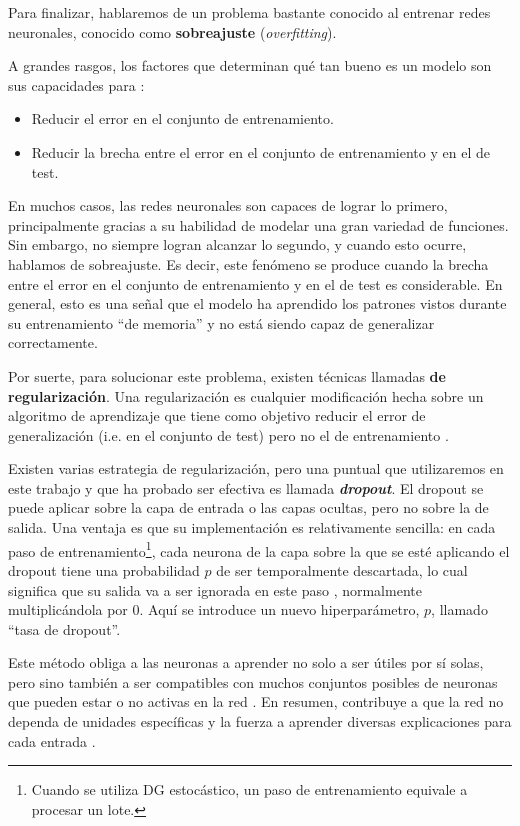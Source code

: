 \documentclass[../../main.tex]{subfiles}
\begin{document}
\bigskip
Para finalizar, hablaremos de un problema bastante conocido al entrenar redes neuronales,
conocido como \textbf{sobreajuste} (\textit{overfitting}).

A grandes rasgos, los factores que determinan qué tan bueno es un modelo son sus capacidades
para \cite{deep-learning}:
\begin{itemize}[itemsep=0.1cm]
    \item Reducir el error en el conjunto de entrenamiento.
    \item Reducir la brecha entre el error en el conjunto de entrenamiento y en el de
    test.
\end{itemize}

En muchos casos, las redes neuronales son capaces de lograr lo primero, principalmente
gracias a su habilidad de modelar una gran variedad de funciones. Sin embargo, no siempre
logran alcanzar lo segundo, y cuando esto ocurre, hablamos de sobreajuste. Es decir, este
fenómeno se produce cuando la brecha entre el error en el conjunto de entrenamiento y en
el de test es considerable. En general, esto es una señal que el modelo ha aprendido los
patrones vistos durante su entrenamiento ``de memoria'' y no está siendo capaz de
generalizar correctamente.

Por suerte, para solucionar este problema, existen técnicas llamadas \textbf{de
regularización}. Una regularización es cualquier modificación hecha sobre un algoritmo de
aprendizaje que tiene como objetivo reducir el error de generalización (i.e. en el
conjunto de test) pero no el de entrenamiento \cite{deep-learning}.

Existen varias estrategia de regularización, pero una puntual que utilizaremos en este
trabajo y que ha probado ser efectiva es llamada \textbf{\textit{dropout}}. El dropout se
puede aplicar sobre la capa de entrada o las capas ocultas, pero no sobre la de salida.
Una ventaja es que su implementación es relativamente sencilla: en cada paso de
entrenamiento\footnote{Cuando se utiliza DG estocástico, un paso de entrenamiento equivale
a procesar un lote.}, cada neurona de la capa sobre la que se esté aplicando el dropout
tiene una probabilidad \(p\) de ser temporalmente descartada, lo cual significa que su
salida va a ser ignorada en este paso \cite{hands-on-ML-sklearn-tf}, normalmente
multiplicándola por 0. Aquí se introduce un nuevo hiperparámetro, \(p\), llamado ``tasa de
dropout''.

Este método obliga a las neuronas a aprender no solo a ser útiles por sí solas,
pero sino también a ser compatibles con muchos conjuntos posibles de neuronas que pueden
estar o no activas en la red \cite{ai-a-modern-approach}. En resumen, contribuye
a que la red no dependa de unidades específicas y la fuerza a aprender diversas
explicaciones para cada entrada \cite{ai-a-modern-approach}.
\end{document}
